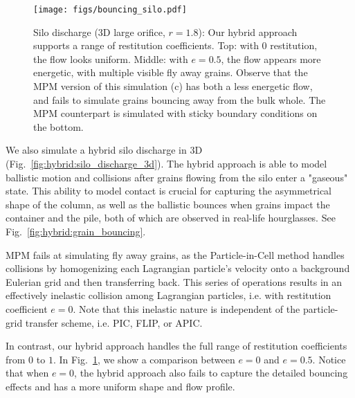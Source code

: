 \begin{figure}
  \centering
  \texttt{[image: figs/bouncing\_silo.pdf]}
  \caption{Silo discharge (3D large orifice, $r=1.8$): Our hybrid approach supports a range of restitution coefficients. Top: with $0$ restitution, the flow looks
  uniform. Middle: with $e=0.5$, the flow appears more energetic, with multiple visible fly away grains. Observe that the MPM version of this simulation (c) has both a less energetic flow, and fails to simulate grains bouncing away from the bulk whole. The MPM counterpart is simulated with sticky boundary conditions on the bottom.}
  \label{COR-compare}
\end{figure}

We also simulate a hybrid silo discharge in 3D (Fig.~\ref{fig:hybrid:silo_discharge_3d}). The hybrid approach is able to model ballistic motion and collisions after grains flowing from the silo enter a "gaseous" state. This ability to model contact is crucial for capturing the asymmetrical shape of the column, as well as the ballistic bounces when grains impact the container and the pile, both of which are observed in real-life hourglasses. See Fig.~\ref{fig:hybrid:grain_bouncing}.

MPM fails at simulating fly away grains, as the Particle-in-Cell method handles collisions by homogenizing each Lagrangian particle's velocity onto a background Eulerian grid and then transferring back. This series of operations results in an effectively inelastic collision among Lagrangian particles, i.e. with restitution coefficient $e = 0$. Note that this inelastic nature is independent of the particle-grid transfer scheme, i.e. PIC, FLIP, or APIC.

In contrast, our hybrid approach handles the full range of restitution coefficients from $0$ to $1$. In Fig.~\ref{COR-compare}, we show a comparison between $e=0$ and $e=0.5$. Notice that when $e=0$, the hybrid approach also fails to capture the detailed bouncing effects and has a more uniform shape and flow profile.


